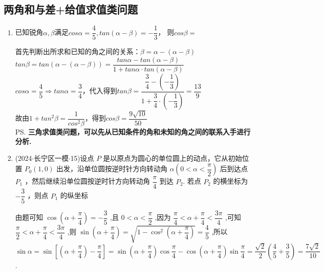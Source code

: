 \subsection*{两角和与差+给值求值类问题}
\begin{enumerate}
    \item 已知锐角$\alpha, \beta$满足$cos\alpha = \dfrac{4}{5}, tan(\alpha - \beta) = -\dfrac{1}{3}$， 则$cos\beta=$ 
    \begin{jieda}
        首先判断出所求和已知的角之间的关系：$\beta = \alpha - (\alpha - \beta)$ \\
        $tan\beta = tan(\alpha - (\alpha - \beta)) = \dfrac{tan\alpha - tan(\alpha - \beta)}{1 + tan\alpha \cdot tan(\alpha - \beta)}$ \\
        $cos\alpha = \dfrac{4}{5} \Longrightarrow tan\alpha = \dfrac{3}{4}$，代入得到$tan\beta = \dfrac{\dfrac{3}{4} - \left(-\dfrac{1}{3}\right)}{1 + \dfrac{3}{4} \cdot \left (-\dfrac{1}{3} \right)} = \dfrac{13}{9}$\\
        故由$1 + tan^2\beta = \dfrac{1}{cos^2\beta}$，得到$cos\beta = \dfrac{9\sqrt{10}}{50}$ \\
        \ps \textbf{三角求值类问题，可以先从已知条件的角和未知的角之间的联系入手进行分析.}
    \end{jieda}
    \item (2024$\cdot$长宁区一模$\cdot$15)设点 $P$ 是以原点为圆心的单位圆上的动点，它从初始位置 ${P}_{0}\left( {1,0}\right)$ 出发，沿单位圆按逆时针方向转动角 $\alpha \left( {0 < \alpha  < \dfrac{\pi }{2}}\right)$ 后到达点 ${P}_{1}$ ，然后继续沿单位圆按逆时针方向转动角 $\dfrac{\pi }{4}$ 到达 ${P}_{2}$. 若点 ${P}_{2}$ 的横坐标为 $- \dfrac{3}{5}$ ，则点 ${P}_{1}$ 的纵坐标 
    \begin{jieda}
        由题可知 $\cos \left( {\alpha  + \dfrac{\pi }{4}}\right)  =  - \dfrac{3}{5}$ ,且 $0 < \alpha  < \dfrac{\pi }{2}$ ,因为 $\dfrac{\pi }{4} < \alpha  + \dfrac{\pi }{4} < \dfrac{3\pi }{4}$ ,可知 $\dfrac{\pi }{2} < \alpha  + \dfrac{\pi }{4} < \dfrac{3\pi }{4}$ ,则 $\sin \left( {\alpha  + \dfrac{\pi }{4}}\right)  =  \sqrt{1 - {\cos }^{2}\left( {\alpha  + \dfrac{\pi }{4}}\right) } = \dfrac{4}{5}$ ,所以 $\sin \alpha  = \sin \left\lbrack  {\left( {\alpha  + \dfrac{\pi }{4}}\right)  - \dfrac{\pi }{4}}\right\rbrack   =  \sin \left( {\alpha  + \dfrac{\pi }{4}}\right) \cos \dfrac{\pi }{4} - \cos \left( {\alpha  + \dfrac{\pi }{4}}\right) \sin \dfrac{\pi }{4} = \dfrac{\sqrt{2}}{2}\left( {\dfrac{4}{5} + \dfrac{3}{5}}\right)  =  \dfrac{7\sqrt{2}}{10}$.
    \end{jieda}
\end{enumerate}

